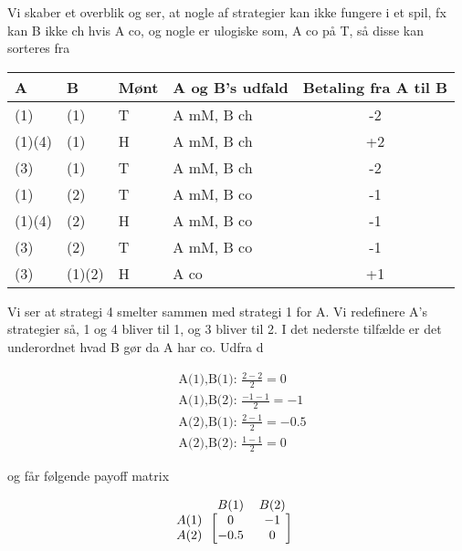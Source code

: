 \documentclass[paper=a4, fontsize=11pt]{scrartcl} %
\numberwithin{equation}{section} %
\numberwithin{figure}{section} %
\numberwithin{table}{section} %
\begin{document}
	Vi skaber et overblik og ser, at nogle af strategier kan ikke fungere i et spil, fx kan B ikke ch hvis A co, og nogle er ulogiske som, A co på T, så disse kan sorteres fra
   
   	\begin{table}[h]
   		\begin{tabular} {l | l | l | l | c}
   			A   &  B  & Mønt & A og B's udfald & Betaling fra A til B \\ \hline
   			(1) & (1) & T &  A mM, B ch & -2 \\ \hline
   			(1)(4) & (1) & H &  A mM, B ch & +2 \\ \hline
   			(3) & (1) & T & A mM, B ch & -2 \\ \hline
   			(1) & (2) & T & A mM, B co & -1\\ \hline
   			(1)(4) & (2) & H & A mM, B co & -1\\ \hline
   			(3) & (2) & T & A mM, B co & -1\\ \hline
   			(3) & (1)(2) & H & A co & +1 \\ \hline
   		\end{tabular}
   	\end{table}
	
	Vi ser at strategi 4 smelter sammen med strategi 1 for A. Vi redefinere A's strategier så, 1 og 4 bliver til 1, og 3 bliver til 2. I det nederste tilfælde er det underordnet hvad B gør da A har co. Udfra d
	
	\begin{align*}
		&\text{A(1),B(1): } \frac{2-2}{2} = 0 \\ 
		&\text{A(1),B(2): }\frac{-1-1}{2} = -1 \\ 
		&\text{A(2),B(1): }\frac{2-1}{2} = -0.5 \\ 
		&\text{A(2),B(2): }\frac{1-1}{2} = 0
	\end{align*}
	
	og får følgende payoff matrix
	
	\begin{align*}
		&\begin{blockarray}{ccc}
				& B(1)& B(2)  \\
				\begin{block}{c[cc]}
				A(1) & 0 & -1  \\
				A(2) & -0.5 & 0  \\
			\end{block}
		\end{blockarray}
	\end{align*}
	
\end{document}
